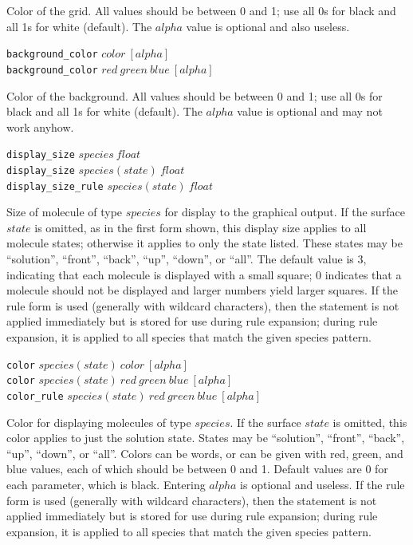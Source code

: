 \documentclass {book}
\newcommand {\ttt} {\texttt}
\begin{document}
\begin{description}
Color of the grid. All values should be between 0 and 1; use all 0s for black and all 1s for white (default). The $alpha$ value is optional and also useless.

\item{\ttt{background\_color} $color\ [alpha]$\\
\ttt{background\_color} $red\ green\ blue\ [alpha]$}

Color of the background. All values should be between 0 and 1; use all 0s for black and all 1s for white (default). The $alpha$ value is optional and may not work anyhow.

\item{\ttt{display\_size} $species\ float$\\
\ttt{display\_size} $species(state)\ float$\\
\ttt{display\_size\_rule} $species(state)\ float$}

Size of molecule of type $species$ for display to the graphical output. If the surface $state$ is omitted, as in the first form shown, this display size applies to all molecule states; otherwise it applies to only the state listed. These states may be ``solution'', ``front'', ``back'', ``up'', ``down'', or ``all''. The default value is 3, indicating that each molecule is displayed with a small square; 0 indicates that a molecule should not be displayed and larger numbers yield larger squares. If the rule form is used (generally with wildcard characters), then the statement is not applied immediately but is stored for use during rule expansion; during rule expansion, it is applied to all species that match the given species pattern.

\item{\ttt{color} $species(state)\ color\ [alpha]$\\
\ttt{color} $species(state)\ red\ green\ blue\ [alpha]$\\
\ttt{color\_rule} $species(state)\ red\ green\ blue\ [alpha]$}

Color for displaying molecules of type $species$. If the surface $state$ is omitted, this color applies to just the solution state. States may be ``solution'', ``front'', ``back'', ``up'', ``down'', or ``all''. Colors can be words, or can be given with red, green, and blue values, each of which should be between 0 and 1. Default values are 0 for each parameter, which is black. Entering $alpha$ is optional and useless. If the rule form is used (generally with wildcard characters), then the statement is not applied immediately but is stored for use during rule expansion; during rule expansion, it is applied to all species that match the given species pattern.


\end{description}
\end{document}
